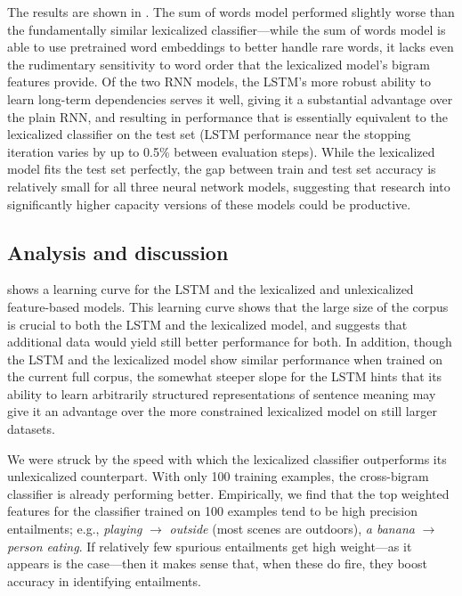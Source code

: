 The results are shown in . The sum of words model performed slightly worse than the fundamentally similar lexicalized classifier---while the sum of words model is able to use pretrained word embeddings to better handle rare words, it lacks even the rudimentary sensitivity to word order that the lexicalized model's bigram features provide. Of the two RNN models, the LSTM's more robust ability to learn long-term dependencies serves it well, giving it a substantial advantage over the plain RNN, and  resulting in performance that is essentially equivalent to the lexicalized classifier on the test set (LSTM performance near the stopping iteration varies by up to 0.5\% between evaluation steps). While the lexicalized model fits the test set perfectly, the gap between train and test set accuracy is relatively small for all three neural network models, suggesting that research into significantly higher capacity versions of these models could be productive.

\subsection{Analysis and discussion}

 shows a learning curve for the LSTM and the lexicalized and unlexicalized feature-based models. This learning curve shows that the large size of the corpus is crucial to both the LSTM and the lexicalized model, and suggests that additional data would yield still better performance for both. In addition, though the LSTM and the lexicalized model show similar performance when trained on the current full corpus, the somewhat steeper slope for the LSTM hints that its ability to learn arbitrarily structured representations of sentence meaning may give it an advantage over the more constrained lexicalized model on still larger datasets.



We were struck by the speed with which the lexicalized classifier outperforms its unlexicalized counterpart.
With only 100 training examples, the cross-bigram classifier is already performing better.
Empirically, we find that the top weighted features for the classifier
  trained on 100 examples tend to be high precision entailments;
  e.g.,
  \textit{playing} $\rightarrow$ \textit{outside}
  (most scenes are outdoors), \textit{a banana} $\rightarrow$
  \textit{person eating}.
If relatively few spurious entailments get high weight---as it appears
is the case---then it makes sense that, when these do fire, they
boost accuracy in identifying entailments.
  
